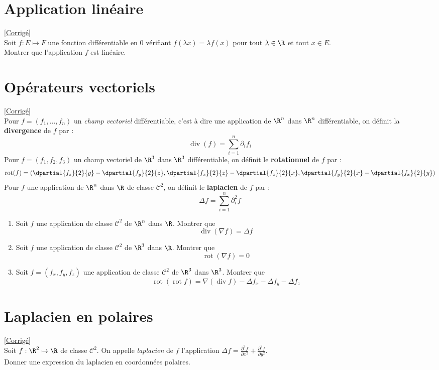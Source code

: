 \documentclass{book}
\begin{document}
\section{Application linéaire}
\label{Application linéaire}
\textcolor{blue}{\hyperref[sec:application-lineaire]{[Corrigé]}}\\
Soit $f:E\mapsto F$ une fonction différentiable en 0 vérifiant $f(\lambda x)=\lambda f(x)$ pour tout $\lambda\in\R$ et tout $x\in E$.
\\ Montrer que l'application $f$ est linéaire.

\section{Opérateurs vectoriels}
\label{Opérateurs vectoriels}
\textcolor{blue}{\hyperref[sec:operateurs-vectoriels]{[Corrigé]}}\\
Pour $f=(f_1,\dots,f_n)$ un \textit{champ vectoriel} différentiable, c'est à dire une application de $\R^n$ dans $\R^n$ différentiable, on définit la \textbf{divergence} de $f$ par :
$$\operatorname{div}(f)=\sum_{i=1}^n\partial_if_i$$
Pour $f=(f_1,f_2,f_3)$ un champ vectoriel de $\R^3$ dans $\R^3$ différentiable, on définit le \textbf{rotationnel} de $f$ par :
$$\operatorname{rot}(f)=\left(\dpartial{f_z}{2}{y}-\dpartial{f_y}{2}{z},\dpartial{f_x}{2}{z}-\dpartial{f_z}{2}{x},\dpartial{f_y}{2}{x}-\dpartial{f_x}{2}{y}\right)$$
Pour $f$ une application de $\R^n$ dans $\R$ de classe $\mathcal C^2$, on définit le \textbf{laplacien} de $f$ par :
$$\Delta f=\sum_{i=1}^n\partial_i^2f$$
\begin{enumerate}
	\item  Soit $f$ une application de classe $\mathcal C^2$ de $\R^n$ dans $\R$. Montrer que
	$$\operatorname{div}(\nabla f)=\Delta f$$
	\item Soit $f$ une application de classe $\mathcal C^2$ de $\R^3$ dans $\R$. Montrer que
	$$\operatorname{rot}(\nabla f)=0$$
	\item Soit $f=(f_x,f_y,f_z)$ une application de classe $\mathcal C^2$ de $\R^3$ dans $\R^3$. Montrer que
	$$\operatorname{rot}(\operatorname{rot}f)=\nabla(\operatorname{div}f)-\Delta f_x-\Delta f_y-\Delta f_z$$
\end{enumerate}

\section{Laplacien en polaires}
\label{Laplacien en polaires}
\textcolor{blue}{\hyperref[sec:laplacien-en-polaires]{[Corrigé]}}\\
Soit $f:\R^2\mapsto\R$ de classe $\mathcal{C}^2$. On appelle \textit{laplacien} de $f$ l'application $\Delta f =\displaystyle\frac{\partial^2 f}{\partial x^2}+\frac{\partial^2 f}{\partial y^2}$.
\\Donner une expression du laplacien en coordonnées polaires.
\end{document}
